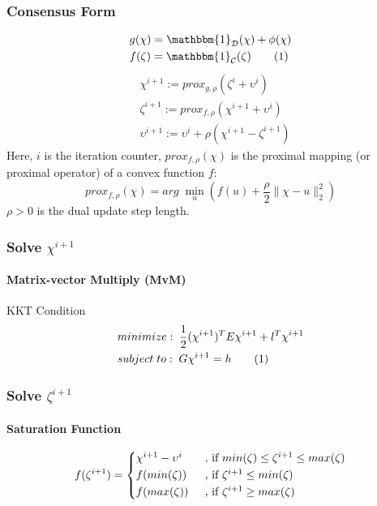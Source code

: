 \documentclass{beamer}
\newcommand\numberthis{\addtocounter{equation}{1}\tag{\theequation}}
\begin{document}
\begin{frame}  
\frametitle{Consensus Form}
\begin{align*}
&g(\chi)=\mathbbm{1}_{\mathcal{D}}(\chi)+\phi(\chi)\\
&f(\zeta)=\mathbbm{1}_{\mathcal{C}}(\zeta) 
\numberthis \label{eq:gf}
\end{align*}
\begin{align}
&\chi^{i+1}:=prox_{g,\rho}(\zeta^i+\upsilon^i)\label{eq:xi}\\
&\zeta^{i+1}:=prox_{f,\rho}(\chi^{i+1}+\upsilon^i)\label{eq:zi}\\
&\upsilon^{i+1}:=\upsilon^i+\rho (\chi^{i+1}-\zeta^{i+1})\label{eq:vi}
\end{align}
Here, $i$ is the iteration counter, $prox_{f,\rho}(\chi)$ is the proximal mapping (or proximal operator) of a convex function $f$: 
\begin{equation*}
prox_{f,\rho}(\chi)=arg\;\underset{u}{\min}(f(u)+\frac{\rho}{2}\| \chi-u\| _2^2)
\end{equation*}
$\rho>0$ is the dual update step length. 

\end{frame}

\begin{frame}
\frametitle{Solve $\chi^{i+1}$}
\framesubtitle{Matrix-vector Multiply (MvM)}
KKT Condition
\begin{align*}
&minimize:\;  \frac{1}{2} ({\chi^{i+1}})^{T}E\chi^{i+1}+l^T\chi^{i+1}\\
 &subject\;  to:\; G\chi^{i+1}=h
\numberthis \label{eq:quad}
\end{align*}
\end{frame}

\begin{frame}
\frametitle{Solve $\zeta^{i+1}$}
\framesubtitle{Saturation Function}

\[ f(\zeta ^{i+1}) =
  \begin{cases*}
   \chi^{i+1}-\upsilon^i \quad& , if $ min(\zeta) \leq \zeta^{i+1} \leq max(\zeta)$\\
   f(min(\zeta)) & , if $\zeta^{i+1} \leq min(\zeta) $ \\
   f(max(\zeta)) & , if $\zeta^{i+1} \geq max(\zeta) $ \\
  \end{cases*}\]
\end{frame}
\end{document}
